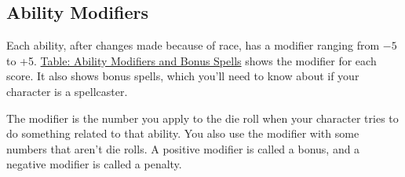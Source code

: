 

\subsection{Ability Modifiers}

Each ability, after changes made because of race, has a modifier ranging from $-5$ to +5. \hyperref[tab:Ability Modifiers and Bonus Spells]{Table: Ability Modifiers and Bonus Spells} shows the modifier for each score. It also shows bonus spells, which you'll need to know about if your character is a spellcaster.

The modifier is the number you apply to the die roll when your character tries to do something related to that ability. You also use the modifier with some numbers that aren't die rolls. A positive modifier is called a bonus, and a negative modifier is called a penalty.

